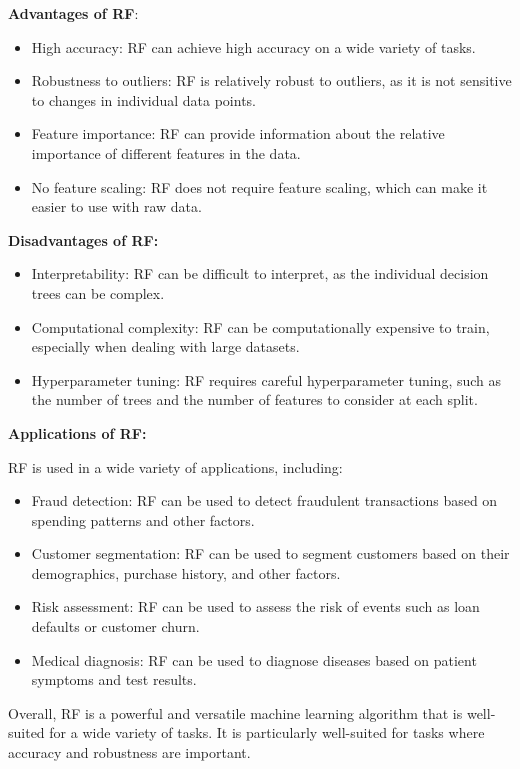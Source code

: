 \textbf{Advantages of RF}:

\begin{itemize}
    \item High accuracy: RF can achieve high accuracy on a wide variety of tasks.

    \item Robustness to outliers: RF is relatively robust to outliers, as it is not sensitive to changes in individual data points.

    \item Feature importance: RF can provide information about the relative importance of different features in the data.

    \item No feature scaling: RF does not require feature scaling, which can make it easier to use with raw data.

\end{itemize}
\textbf{Disadvantages of RF:}

\begin{itemize}
    \item Interpretability: RF can be difficult to interpret, as the individual decision trees can be complex.

    \item Computational complexity: RF can be computationally expensive to train, especially when dealing with large datasets.

    \item Hyperparameter tuning: RF requires careful hyperparameter tuning, such as the number of trees and the number of features to consider at each split.

\end{itemize}

\textbf{Applications of RF:}

RF is used in a wide variety of applications, including:

\begin{itemize}
    \item Fraud detection: RF can be used to detect fraudulent transactions based on spending patterns and other factors.

    \item Customer segmentation: RF can be used to segment customers based on their demographics, purchase history, and other factors.

    \item Risk assessment: RF can be used to assess the risk of events such as loan defaults or customer churn.

    \item Medical diagnosis: RF can be used to diagnose diseases based on patient symptoms and test results.

\end{itemize}
Overall, RF is a powerful and versatile machine learning algorithm that is well-suited for a wide variety of tasks. It is particularly well-suited for tasks where accuracy and robustness are important.

